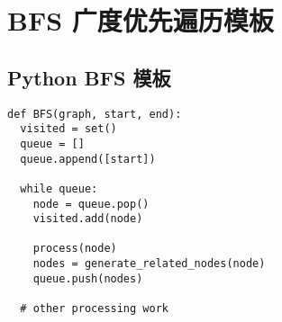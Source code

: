 \newpage
\section{BFS 广度优先遍历模板}

\subsection{Python BFS 模板}

\begin{verbatim}
def BFS(graph, start, end):
  visited = set()
  queue = []
  queue.append([start])

  while queue:
    node = queue.pop()
    visited.add(node)

    process(node)
    nodes = generate_related_nodes(node)
    queue.push(nodes)

  # other processing work
\end{verbatim}
